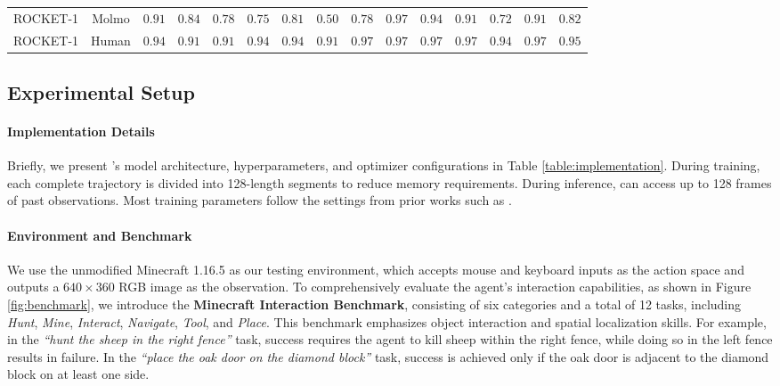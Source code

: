 \documentclass[11pt, a4paper, logo, two column]{craftjarvis}
\begin{document}
\begin{table}[ht]
\begin{adjustbox}{width=\linewidth}
\begin{tabular}{@{}lcccccccccccccc@{}}
 ROCKET-1   & Molmo  &  $\mathbf{0.91}$ &  $\mathbf{0.84}$ &  $\mathbf{0.78}$ & $\mathbf{0.75}$ & $\mathbf{0.81}$ & $\mathbf{0.50}$ & $\mathbf{0.78}$ &  $\mathbf{0.97}$ & $\mathbf{0.94}$ &  $\mathbf{0.91}$ & $\mathbf{0.72}$ & $\mathbf{0.91}$ & $\mathbf{0.82}$ \\
 ROCKET-1   & Human  & $\mathbf{0.94}$ & $\mathbf{0.91}$ & $\mathbf{0.91}$ & $\mathbf{0.94}$ & $\mathbf{0.94}$ & $\mathbf{0.91}$ & $\mathbf{0.97}$ & $\mathbf{0.97}$ & $\mathbf{0.97}$ & $\mathbf{0.97}$ &  $\mathbf{0.94}$ & $\mathbf{0.97}$ & $\mathbf{0.95}$ \\
 \bottomrule
\end{tabular}
\end{adjustbox}
\end{table}

\subsection{Experimental Setup}

\paragraph{Implementation Details} 
Briefly, we present \agent’s model architecture, hyperparameters, and optimizer configurations in Table \ref{table:implementation}. During training, each complete trajectory is divided into 128-length segments to reduce memory requirements. During inference, \agent can access up to 128 frames of past observations. Most training parameters follow the settings from prior works such as \cite{groot1, groot2, vpt}. 

\paragraph{Environment and Benchmark} We use the unmodified Minecraft 1.16.5 \citep{minerl,mcu} as our testing environment, which accepts mouse and keyboard inputs as the action space and outputs a $640\times360$ RGB image as the observation. To comprehensively evaluate the agent’s interaction capabilities, as shown in Figure \ref{fig:benchmark}, we introduce the \textbf{Minecraft Interaction Benchmark}, consisting of six categories and a total of 12 tasks, including \textit{Hunt}, \textit{Mine}, \textit{Interact}, \textit{Navigate}, \textit{Tool}, and \textit{Place}. This benchmark emphasizes object interaction and spatial localization skills. For example, in the \textit{``hunt the sheep in the right fence''} task, success requires the agent to kill sheep within the right fence, while doing so in the left fence results in failure. In the \textit{``place the oak door on the diamond block''} task, success is achieved only if the oak door is adjacent to the diamond block on at least one side. 
\end{document}
